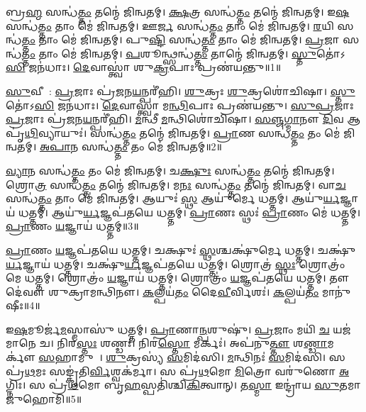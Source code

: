 \setcounter{anuvakam}{0}

𑌬𑍍𑌰\ul{𑌹𑍍𑌮} 𑌸𑌨𑍍𑌧॑\ul{𑌤𑍍𑌤𑌂} 𑌤𑌨𑍍𑌮𑍇॑ 𑌜𑌿𑌨𑍍𑌵𑌤𑌮𑍍।
\ul{𑌕𑍍𑌷}𑌤𑍍𑌰 𑌸𑌨𑍍𑌧॑\ul{𑌤𑍍𑌤𑌂} 𑌤𑌨𑍍𑌮𑍇॑ 𑌜𑌿𑌨𑍍𑌵𑌤𑌮𑍍।
𑌇\ul{𑌷}\ul{} 𑌸𑌨𑍍𑌧॑\ul{𑌤𑍍𑌤𑌂} 𑌤𑌾𑌂 𑌮𑍇॑ 𑌜𑌿𑌨𑍍𑌵𑌤𑌮𑍍।
𑌊\ul{𑌰𑍍𑌜}\ul{} 𑌸𑌨𑍍𑌧॑\ul{𑌤𑍍𑌤𑌂} 𑌤𑌾𑌂 𑌮𑍇॑ 𑌜𑌿𑌨𑍍𑌵𑌤𑌮𑍍।
\ul{𑌰}𑌯𑌿 𑌸𑌨𑍍𑌧॑\ul{𑌤𑍍𑌤𑌂} 𑌤𑌾𑌂 𑌮𑍇॑ 𑌜𑌿𑌨𑍍𑌵𑌤𑌮𑍍।
𑌪𑍁\ul{𑌷𑍍𑌟𑌿}\ul{} 𑌸𑌨𑍍𑌧॑\ul{𑌤𑍍𑌤𑌂} 𑌤𑌾𑌂 𑌮𑍇॑ 𑌜𑌿𑌨𑍍𑌵𑌤𑌮𑍍।
\ul{𑌪𑍍𑌰}𑌜𑌾 𑌸𑌨𑍍𑌧॑\ul{𑌤𑍍𑌤𑌂} 𑌤𑌾𑌂 𑌮𑍇॑ 𑌜𑌿𑌨𑍍𑌵𑌤𑌮𑍍।
\ul{𑌪}𑌶𑍂𑌨𑍍𑌥𑍍𑌸𑌨𑍍𑌧॑\ul{𑌤𑍍𑌤𑌂} 𑌤𑌾𑌨𑍍𑌮𑍇॑ 𑌜𑌿𑌨𑍍𑌵𑌤𑌮𑍍।
\ul{𑌸𑍍𑌤𑍁}𑌤𑍋॑𑌽\ul{𑌸𑌿} 𑌜𑌨॑𑌧𑌾𑌃।
\ul{𑌦𑍇}𑌵𑌾𑌸𑍍𑌤𑍍𑌵𑌾॑ 𑌶𑍁\ul{𑌕𑍍𑌰}𑌪𑌾𑌃 𑌪𑍍𑌰𑌣॑𑌯𑌨𑍍𑌤𑍁॥1॥

\ul{𑌸𑍁}𑌵𑍀𑌰𑌾᳚: \ul{𑌪𑍍𑌰}𑌜𑌾𑌃 𑌪𑍍𑌰॑\ul{𑌜}𑌨\ul{𑌯}𑌨𑍍𑌪𑌰𑍀॑𑌹𑌿।
\ul{𑌶𑍁}𑌕𑍍𑌰𑌃 \ul{𑌶𑍁}𑌕𑍍𑌰𑌶𑍋॑𑌚𑌿𑌷𑌾।
\ul{𑌸𑍍𑌤𑍁}𑌤𑍋॑𑌽\ul{𑌸𑌿} 𑌜𑌨॑𑌧𑌾𑌃।
\ul{𑌦𑍇}𑌵𑌾𑌸𑍍𑌤𑍍𑌵𑌾॑ 𑌮\ul{𑌨𑍍𑌥𑌿}𑌪𑌾𑌃 𑌪𑍍𑌰𑌣॑𑌯𑌨𑍍𑌤𑍁।
\ul{𑌸𑍁}\ul{𑌪𑍍𑌰}𑌜𑌾𑌃 \ul{𑌪𑍍𑌰}𑌜𑌾𑌃 𑌪𑍍𑌰॑\ul{𑌜}𑌨\ul{𑌯}𑌨𑍍𑌪𑌰𑍀॑𑌹𑌿।
\ul{𑌮}𑌨𑍍𑌥𑍀 \ul{𑌮}𑌨𑍍𑌥𑌿𑌶𑍋॑𑌚𑌿𑌷𑌾।
\ul{𑌸}\ul{𑌞𑍍𑌜}\ul{𑌗𑍍𑌮𑌾}𑌨𑍗 \ul{𑌦𑌿}𑌵 𑌆𑌪𑍃॑\ul{𑌥𑌿}𑌵𑍍𑌯𑌾𑌯𑍁𑌃॑।
𑌸𑌨𑍍𑌧॑\ul{𑌤𑍍𑌤𑌂} 𑌤𑌨𑍍𑌮𑍇॑ 𑌜𑌿𑌨𑍍𑌵𑌤𑌮𑍍।
\ul{𑌪𑍍𑌰𑌾}𑌣 𑌸𑌨𑍍𑌧॑\ul{𑌤𑍍𑌤𑌂} 𑌤𑌂 𑌮𑍇॑ 𑌜𑌿𑌨𑍍𑌵𑌤𑌮𑍍।
\ul{𑌅}\ul{𑌪𑌾}𑌨 𑌸𑌨𑍍𑌧॑\ul{𑌤𑍍𑌤𑌂} 𑌤𑌂 𑌮𑍇॑ 𑌜𑌿𑌨𑍍𑌵𑌤𑌮𑍍॥2॥

\ul{𑌵𑍍𑌯𑌾}𑌨 𑌸𑌨𑍍𑌧॑\ul{𑌤𑍍𑌤𑌂} 𑌤𑌂 𑌮𑍇॑ 𑌜𑌿𑌨𑍍𑌵𑌤𑌮𑍍।
𑌚\ul{𑌕𑍍𑌷𑍁𑌃} 𑌸𑌨𑍍𑌧॑\ul{𑌤𑍍𑌤𑌂} 𑌤𑌨𑍍𑌮𑍇॑ 𑌜𑌿𑌨𑍍𑌵𑌤𑌮𑍍।
𑌶𑍍𑌰𑍋\ul{𑌤𑍍𑌰}\ul{} 𑌸𑌨𑍍𑌧॑\ul{𑌤𑍍𑌤𑌂} 𑌤𑌨𑍍𑌮𑍇॑ 𑌜𑌿𑌨𑍍𑌵𑌤𑌮𑍍।
𑌮\ul{𑌨𑌃} 𑌸𑌨𑍍𑌧॑\ul{𑌤𑍍𑌤𑌂} 𑌤𑌨𑍍𑌮𑍇॑ 𑌜𑌿𑌨𑍍𑌵𑌤𑌮𑍍।
𑌵𑌾\ul{𑌚}\ul{} 𑌸𑌨𑍍𑌧॑\ul{𑌤𑍍𑌤𑌂} 𑌤𑌾𑌂 𑌮𑍇॑ 𑌜𑌿𑌨𑍍𑌵𑌤𑌮𑍍।
𑌆𑌯𑍁𑌃॑ \ul{𑌸𑍍𑌥} 𑌆𑌯𑍁॑𑌰𑍍𑌮𑍇 𑌧𑌤𑍍𑌤𑌮𑍍।
𑌆𑌯𑍁॑\ul{𑌰𑍍𑌯}𑌜𑍍𑌞𑌾𑌯॑ 𑌧𑌤𑍍𑌤𑌮𑍍।
𑌆𑌯𑍁॑\ul{𑌰𑍍𑌯}𑌜𑍍𑌞𑌪॑𑌤𑌯𑍇 𑌧𑌤𑍍𑌤𑌮𑍍।
\ul{𑌪𑍍𑌰𑌾}𑌣𑌃 𑌸𑍍𑌥𑌃॑ \ul{𑌪𑍍𑌰𑌾}𑌣𑌂 𑌮𑍇॑ 𑌧𑌤𑍍𑌤𑌮𑍍।
\ul{𑌪𑍍𑌰𑌾}𑌣𑌂 \ul{𑌯}𑌜𑍍𑌞𑌾𑌯॑ 𑌧𑌤𑍍𑌤𑌮𑍍॥3॥

\ul{𑌪𑍍𑌰𑌾}𑌣𑌂 \ul{𑌯}𑌜𑍍𑌞𑌪॑𑌤𑌯𑍇 𑌧𑌤𑍍𑌤𑌮𑍍।
𑌚𑌕𑍍𑌷𑍁𑌃॑ \ul{𑌸𑍍𑌥}𑌶𑍍𑌚𑌕𑍍𑌷𑍁॑𑌰𑍍𑌮𑍇 𑌧𑌤𑍍𑌤𑌮𑍍।
𑌚𑌕𑍍𑌷𑍁॑\ul{𑌰𑍍𑌯}𑌜𑍍𑌞𑌾𑌯॑ 𑌧𑌤𑍍𑌤𑌮𑍍।
𑌚𑌕𑍍𑌷𑍁॑\ul{𑌰𑍍𑌯}𑌜𑍍𑌞𑌪॑𑌤𑌯𑍇 𑌧𑌤𑍍𑌤𑌮𑍍।
𑌶𑍍𑌰𑍋𑌤𑍍𑌰॑ \ul{𑌸𑍍𑌥𑌃} 𑌶𑍍𑌰𑍋𑌤𑍍𑌰𑌂॑ 𑌮𑍇 𑌧𑌤𑍍𑌤𑌮𑍍।
𑌶𑍍𑌰𑍋𑌤𑍍𑌰𑌂॑ \ul{𑌯}𑌜𑍍𑌞𑌾𑌯॑ 𑌧𑌤𑍍𑌤𑌮𑍍।
𑌶𑍍𑌰𑍋𑌤𑍍𑌰𑌂॑ \ul{𑌯}𑌜𑍍𑌞𑌪॑𑌤𑌯𑍇 𑌧𑌤𑍍𑌤𑌮𑍍।
𑌤𑍗 𑌦𑍇॑𑌵𑍗 𑌶𑍁𑌕𑍍𑌰𑌾𑌮𑌨𑍍𑌥𑌿𑌨𑍗।
\ul{𑌕}𑌲𑍍𑌪𑌯॑\ul{𑌤𑌂} 𑌦𑍈\ul{𑌵𑍀}𑌰𑍍𑌵𑌿𑌶𑌃॑।
\ul{𑌕}𑌲𑍍𑌪𑌯॑\ul{𑌤𑌂} 𑌮𑌾𑌨𑍁॑𑌷𑍀𑌃॥4॥

𑌇\ul{𑌷}𑌮𑍂𑌰𑍍𑌜॑\ul{𑌮}𑌸𑍍𑌮𑌾𑌸𑍁॑ 𑌧𑌤𑍍𑌤𑌮𑍍।
\ul{𑌪𑍍𑌰𑌾}𑌣𑌾\ul{𑌨𑍍𑌪}𑌶𑍁𑌷𑍁॑।
\ul{𑌪𑍍𑌰}𑌜𑌾𑌂 𑌮𑌯𑌿॑ \ul{𑌚} 𑌯𑌜॑𑌮𑌾𑌨𑍇 𑌚।
𑌨𑌿𑌰॑\ul{𑌸𑍍𑌤𑌃} 𑌶𑌣𑍍𑌡𑌃॑।
𑌨𑌿𑌰॑\ul{𑌸𑍍𑌤𑍋} 𑌮𑌰𑍍𑌕𑌃॑।
𑌅𑌪॑𑌨𑍁\ul{𑌤𑍍𑌤𑍗} 𑌶\ul{𑌣𑍍𑌡𑌾}𑌮𑌰𑍍𑌕𑍗॑ \ul{𑌸}𑌹𑌾𑌮𑍁𑌨𑌾᳚।
\ul{𑌶𑍁}𑌕𑍍𑌰𑌸𑍍𑌯॑ \ul{𑌸}𑌮𑌿𑌦॑𑌸𑌿।
\ul{𑌮}𑌨𑍍𑌥𑌿𑌨𑌃॑ \ul{𑌸}𑌮𑌿𑌦॑𑌸𑌿।
𑌸 𑌪𑍍𑌰॑\ul{𑌥}𑌮𑌃 𑌸𑌙𑍍𑌕𑍃॑𑌤𑌿\ul{𑌰𑍍𑌵𑌿}𑌶𑍍𑌵𑌕॑𑌰𑍍𑌮𑌾।
𑌸 𑌪𑍍𑌰॑\ul{𑌥}𑌮𑍋 \ul{𑌮𑌿}𑌤𑍍𑌰𑍋 𑌵𑌰𑍁॑𑌣𑍋 \ul{𑌅}𑌗𑍍𑌨𑌿𑌃।
𑌸 𑌪𑍍𑌰॑\ul{𑌥}𑌮𑍋 𑌬𑍃\ul{𑌹}𑌸𑍍𑌪𑌤𑌿॑𑌶𑍍𑌚𑌿\ul{𑌕𑌿}𑌤𑍍𑌵𑌾𑌨𑍍।
𑌤\ul{𑌸𑍍𑌮𑌾} 𑌇𑌨𑍍𑌦𑍍𑌰𑌾॑𑌯 \ul{𑌸𑍁}𑌤𑌮𑌾 𑌜𑍁॑𑌹𑍋𑌮𑌿॥5॥

